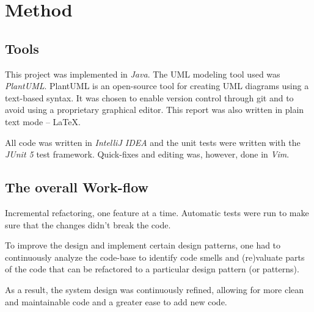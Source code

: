 \documentclass[a4paper]{scrreprt}
\begin{document}





\chapter{Method}
\section*{Tools}
This project was implemented in \emph{Java}.
The UML modeling tool used was \emph{PlantUML}.
PlantUML is an open-source tool for creating UML diagrams using a text-based
syntax.
It was chosen to enable version control through git and to avoid using a
proprietary graphical editor.
This report was also written in plain text mode -- \LaTeX.

All code was written in \emph{IntelliJ IDEA} and the unit tests were written with the \emph{JUnit 5} test framework.
Quick-fixes and editing was, however, done in \emph{Vim}.

\section*{The overall Work-flow}
Incremental refactoring, one feature at a time.
Automatic tests were run to make sure that the changes didn't break the code.

To improve the design and implement certain design patterns,
one had to continuously analyze the code-base to identify code smells and
(re)valuate parts of the code that can be refactored to a
particular design pattern (or patterns).

As a result, the system design was continuously refined,
allowing for more clean and maintainable code and a greater ease to add new code.
\end{document}
